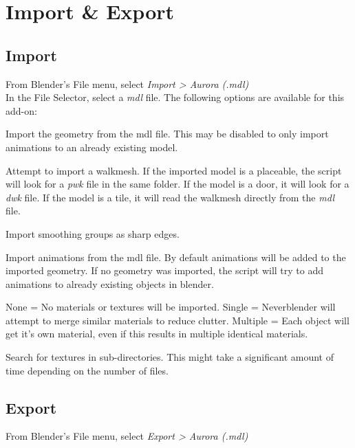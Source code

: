 \chapter{Import \& Export}

\section{Import}
From Blender's File menu, select \textit{Import > Aurora (.mdl)} \\

In the File Selector, select a \textit{mdl} file. 
The following options are available for this add-on: 

\begin{description}[leftmargin=13em,style=nextline]
    \item[Import Geometry] Import the geometry from the mdl file. This may be disabled to only import animations to an already existing model.
    \item[Import Walkmesh] Attempt to import a walkmesh. If the imported model is a placeable, the script will look for a {\textit{pwk}} file in the same folder. If the model is a door, it will look for a {\textit{dwk}} file. If the model is a tile, it will read the walkmesh directly from the \textit{mdl} file.
    \item[Import Smooth Groups] Import smoothing groups as sharp edges.
    \item[Import Animations] Import animations from the mdl file. By default animations will be added to the imported geometry. If no geometry was imported, the script will try to add animations to already existing objects in blender.
    \item[Materials] None = No materials or textures will be imported. Single = Neverblender will attempt to merge similar materials to reduce clutter. Multiple = Each object will get it's own material, even if this results in multiple identical materials.
    \item[Image Search] Search for textures in sub-directories. This might take a significant amount of time depending on the number of files.
\end{description}

\section{Export}
From Blender's File menu, select \textit{Export > Aurora (.mdl)} \\

